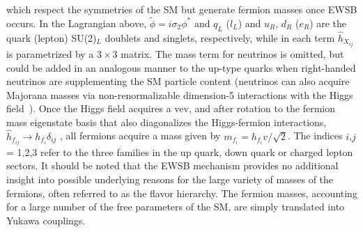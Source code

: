 which respect the symmetries of the SM but generate fermion
masses once EWSB occurs. In the Lagrangian above, $\tilde{\phi} = i\sigma_2\phi^*$ and $q_L$ ($l_L$) and $u_R$, $d_R$ ($e_R$) are the quark (lepton) SU(2)$_L$ doublets and singlets, respectively, while in each term $\hat{h}_{X_{ij}}$ is parametrized by a $3\times3$ matrix. The mass term for neutrinos is omitted, but could be added in an analogous manner to the up-type quarks when right-handed neutrinos are supplementing the SM particle content (neutrinos can also acquire Majorana masses via non-renormalizable dimension-5 interactions with the Higgs field~\cite{Weinberg:1979sa}). Once the Higgs field acquires a vev, and after rotation to the fermion mass eigenstate basis that also diagonalizes the Higgs-fermion interactions, $\hat{h}_{f_{ij}} \rightarrow h_{f_i} \delta_{ij}$ , all fermions acquire a mass given by $m_{f_i} = h_{f_{i}} v/\sqrt{2}$. The indices $i$,$j$ = 1,2,3 refer to the three families in the up quark, down quark or charged lepton sectors. It should be noted that the EWSB mechanism provides no additional insight into possible underlying reasons for the large variety of masses of the fermions, often referred to as the flavor hierarchy. The fermion masses, accounting for a large number of the free parameters of the SM, are simply translated into Yukawa couplings.


